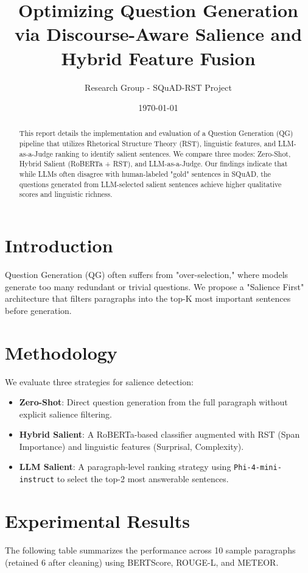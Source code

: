 \documentclass[11pt,a4paper]{article}
\title{Optimizing Question Generation via Discourse-Aware Salience and Hybrid Feature Fusion}
\author{Research Group - SQuAD-RST Project}
\date{\today}
\begin{document}
\maketitle

\begin{abstract}
This report details the implementation and evaluation of a Question Generation (QG) pipeline that utilizes Rhetorical Structure Theory (RST), linguistic features, and LLM-as-a-Judge ranking to identify salient sentences. We compare three modes: Zero-Shot, Hybrid Salient (RoBERTa + RST), and LLM-as-a-Judge. Our findings indicate that while LLMs often disagree with human-labeled "gold" sentences in SQuAD, the questions generated from LLM-selected salient sentences achieve higher qualitative scores and linguistic richness.
\end{abstract}

\section{Introduction}
Question Generation (QG) often suffers from "over-selection," where models generate too many redundant or trivial questions. We propose a "Salience First" architecture that filters paragraphs into the top-K most important sentences before generation.

\section{Methodology}
We evaluate three strategies for salience detection:
\begin{itemize}
    \item \textbf{Zero-Shot}: Direct question generation from the full paragraph without explicit salience filtering.
    \item \textbf{Hybrid Salient}: A RoBERTa-based classifier augmented with RST (Span Importance) and linguistic features (Surprisal, Complexity).
    \item \textbf{LLM Salient}: A paragraph-level ranking strategy using \texttt{Phi-4-mini-instruct} to select the top-2 most answerable sentences.
\end{itemize}

\section{Experimental Results}
The following table summarizes the performance across 10 sample paragraphs (retained 6 after cleaning) using BERTScore, ROUGE-L, and METEOR.
\end{document}
